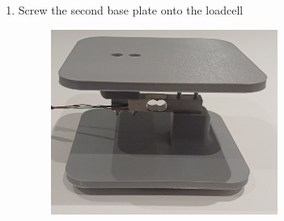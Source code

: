\begin{enumerate}
\begin{figure}[h]
        \label{fig:ufscrewfirstbaseplate}
      \end{figure}
    \item Screw the second base plate onto the loadcell
    \begin{figure}[h]
        \centering
        \includegraphics[width=0.7\textwidth]{Figures/Manufacture/Uroflowmetry/uf_screw_second_baseplate.jpg}
        \label{fig:ufscrewsecondbaseplate}
      \end{figure}
  \end{enumerate}
  